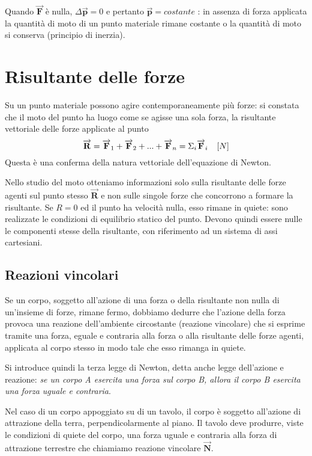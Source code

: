 \documentclass[class=book, crop=false, oneside, 12pt]{standalone}
\begin{document}
Quando \(\overrightarrow{\mathbf{F}}\) è nulla, \(\Delta \overrightarrow{\mathbf{p}} = 0\) e pertanto \(\overrightarrow{\mathbf{p}} = costante\) : in assenza di forza applicata la quantità di moto di un punto materiale rimane costante o la quantità di moto si conserva (principio di inerzia). 

\section{Risultante delle forze}
Su un punto materiale possono agire contemporaneamente più forze: si constata che il moto del punto ha luogo come se agisse una sola forza, la risultante vettoriale delle forze applicate al punto
\begin{equation*}
    \overrightarrow{\mathbf{R}} = \overrightarrow{\mathbf{F}}_1+\overrightarrow{\mathbf{F}}_2+ ... + \overrightarrow{\mathbf{F}}_n = \Sigma_i \overrightarrow{\mathbf{F}}_i \ \udm{N}
\end{equation*}
Questa \`e una conferma della natura vettoriale dell'equazione di Newton.

Nello studio del moto otteniamo informazioni solo sulla risultante delle forze agenti sul punto stesso \(\overrightarrow{\mathbf{R}}\) e non sulle singole forze che concorrono a formare la risultante.
Se \(R = 0\) ed il punto ha velocità nulla, esso rimane in quiete: sono realizzate le condizioni di equilibrio statico del punto. 
Devono quindi essere nulle le componenti stesse della risultante, con riferimento ad un sistema di assi cartesiani.

\subsection{Reazioni vincolari}

Se un corpo, soggetto all'azione di una forza o della risultante non nulla di un'insieme di forze, rimane fermo, dobbiamo dedurre che l'azione della forza provoca una reazione dell'ambiente circostante (reazione vincolare) che si esprime tramite una forza, eguale e contraria alla forza o alla risultante delle forze agenti,
applicata al corpo stesso in modo tale che esso rimanga in quiete.

Si introduce quindi la terza legge di Newton, detta anche legge dell'azione e reazione: 
\emph{se un corpo A esercita una forza sul corpo B, allora il corpo B esercita una forza uguale e contraria}.

Nel caso di un corpo appoggiato su di un tavolo, il corpo è soggetto all'azione di attrazione della terra, perpendicolarmente al piano.
Il tavolo deve produrre, viste le condizioni di quiete del corpo, una forza uguale e contraria alla forza di attrazione terrestre che chiamiamo reazione vincolare \(\overrightarrow{\mathbf{N}}\).
\end{document}
